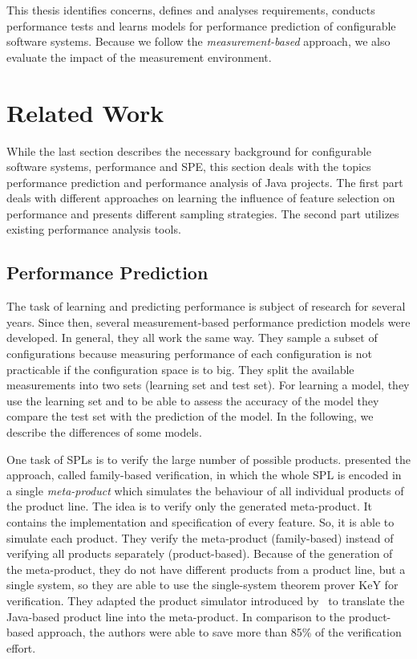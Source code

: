 This thesis identifies concerns, defines and analyses requirements, conducts performance tests and learns models for performance prediction of configurable software systems. Because we follow the \textit{measurement-based} approach, we also evaluate the impact of the measurement environment. 


\section{Related Work}
\label{rel_work}

While the last section describes the necessary background for configurable software systems, performance and \ac{SPE}, this section deals with the topics performance prediction and performance analysis of Java projects. The first part deals with different approaches on learning the influence of feature selection on performance and presents different sampling strategies. The second part utilizes existing performance analysis tools.

\subsection{Performance Prediction}
\label{rel_perf_pred}

The task of learning and predicting performance is subject of research for several years. Since then, several measurement-based performance prediction models were developed. In general, they all work the same way. They sample a subset of configurations because measuring performance of each configuration is not practicable if the configuration space is to big. They split the available measurements into two sets (learning set and test set). For learning a model, they use the learning set and to be able to assess the accuracy of the model they compare the test set with the prediction of the model. In the following, we describe the differences of some models.

One task of \acp{SPL} is to verify the large number of possible products. \cite{thum2012family} presented the approach, called family-based verification, in which the whole \ac{SPL} is encoded in a single \textit{meta-product} which simulates the behaviour of all individual products of the product line. The idea is to verify only the generated meta-product. It contains the implementation and specification of every feature. So, it is able to simulate each product. They verify the meta-product (family-based) instead of verifying all products separately (product-based). Because of the generation of the meta-product, they do not have different products from a product line, but a single system, so they are able to use the single-system theorem prover KeY for verification. They adapted the product simulator introduced by~\cite{apel2011detection} to translate the Java-based product line into the meta-product. In comparison to the product-based approach, the authors were able to save more than 85\% of the verification effort.

